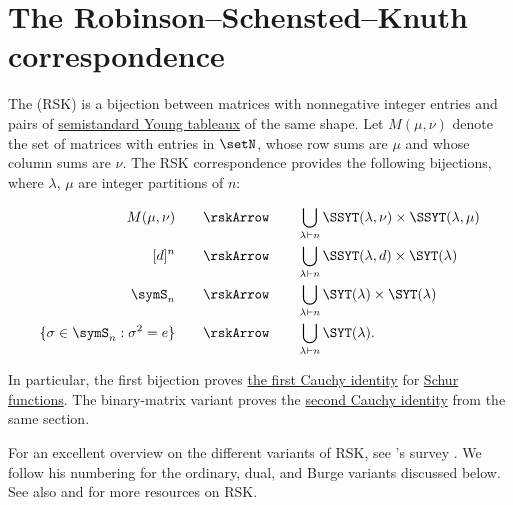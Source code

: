 



\section[rsk]{The Robinson--Schensted--Knuth correspondence}

The \label{rskCorrespondence} (RSK)
is a bijection between matrices with nonnegative integer entries and pairs of
\hyperref[prelimTableaux]{semistandard Young tableaux} of the same shape.
Let $M(\mu,\nu)$ denote the set of matrices with entries in $\setN$,
whose row sums are $\mu$ and whose column sums are $\nu$.
The RSK correspondence provides the following bijections,
where $\lambda$, $\mu$ are integer partitions of $n$:

\begin{align}
M(\mu,\nu) & \qquad \rskArrow \qquad \bigcup_{\lambda \vdash n} \SSYT(\lambda,\nu) \times \SSYT(\lambda,\mu) \\
[d]^n & \qquad \rskArrow \qquad \bigcup_{\lambda \vdash n} \SSYT(\lambda,d) \times \SYT(\lambda)  \\
\symS_n  & \qquad\rskArrow \qquad \bigcup_{\lambda \vdash n} \SYT(\lambda) \times \SYT(\lambda) \\
\{\sigma \in \symS_n : \sigma^2 = e \}  & \qquad \rskArrow \qquad \bigcup_{\lambda \vdash n} \SYT(\lambda).
\end{align}

In particular, the first bijection proves
\hyperref[schurCauchyFormula]{the first Cauchy identity} for
\hyperref[schurS]{Schur functions}.  The binary-matrix variant proves the
\hyperref[schurCauchyFormula]{second Cauchy identity} from the same section.


For an excellent overview on the different variants of RSK, see
's survey \cite{Krattenthaler2006}.
We follow his numbering for the ordinary, dual, and Burge variants discussed
below.  See also \cite[App.~A.4.3]{Fulton1997} and \cite{Sagan2001} for more
resources on RSK.

